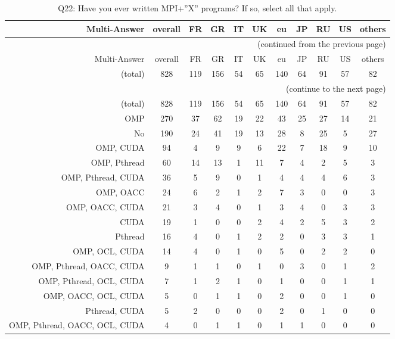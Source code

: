\clearpage%
{\footnotesize\begin{landscape}%
\begin{longtable}[htb]{r|c|c|c|c|c|c|c|c|c|c}%
\caption{Q22: Have you ever written MPI+”X” programs? If so, select all that apply.}%
\label{tab:Q22-mans} \\%
\hline%
Multi-Answer & overall & FR & GR & IT & UK & eu & JP & RU & US & others \\
 \hline%
\endfirsthead%
\multicolumn{11}{r}{(continued from the previous page)}\\%
\hline%
Multi-Answer & overall & FR & GR & IT & UK & eu & JP & RU & US & others \\
 \hline%
\endhead%
\hline%
(total) & 828 & 119 & 156 & 54 & 65 & 140 & 64 & 91 & 57 & 82 \\%
\hline%
\multicolumn{11}{r}{(continue to the next page)}\\%
\endfoot%
\hline%
(total) & 828 & 119 & 156 & 54 & 65 & 140 & 64 & 91 & 57 & 82 \\%
\hline%
\endlastfoot%
\hline%
{OMP} & 270 & 37 & 62 & 19 & 22 & 43 & 25 & 27 & 14 & 21 \\%
{No} & 190 & 24 & 41 & 19 & 13 & 28 & 8 & 25 & 5 & 27 \\%
{OMP, CUDA} & 94 & 4 & 9 & 9 & 6 & 22 & 7 & 18 & 9 & 10 \\%
{OMP, Pthread} & 60 & 14 & 13 & 1 & 11 & 7 & 4 & 2 & 5 & 3 \\%
{OMP, Pthread, CUDA} & 36 & 5 & 9 & 0 & 1 & 4 & 4 & 4 & 6 & 3 \\%
{OMP, OACC} & 24 & 6 & 2 & 1 & 2 & 7 & 3 & 0 & 0 & 3 \\%
{OMP, OACC, CUDA} & 21 & 3 & 4 & 0 & 1 & 3 & 4 & 0 & 3 & 3 \\%
{CUDA} & 19 & 1 & 0 & 0 & 2 & 4 & 2 & 5 & 3 & 2 \\%
{Pthread} & 16 & 4 & 0 & 1 & 2 & 2 & 0 & 3 & 3 & 1 \\%
{OMP, OCL, CUDA} & 14 & 4 & 0 & 1 & 0 & 5 & 0 & 2 & 2 & 0 \\%
{OMP, Pthread, OACC, CUDA} & 9 & 1 & 1 & 0 & 1 & 0 & 3 & 0 & 1 & 2 \\%
{OMP, Pthread, OCL, CUDA} & 7 & 1 & 2 & 1 & 0 & 1 & 0 & 0 & 1 & 1 \\%
{OMP, OACC, OCL, CUDA} & 5 & 0 & 1 & 1 & 0 & 2 & 0 & 0 & 1 & 0 \\%
{Pthread, CUDA} & 5 & 2 & 0 & 0 & 0 & 2 & 0 & 1 & 0 & 0 \\%
{OMP, Pthread, OACC, OCL, CUDA} & 4 & 0 & 1 & 1 & 0 & 1 & 1 & 0 & 0 & 0 \\%

\end{longtable}
\end{landscape}}
